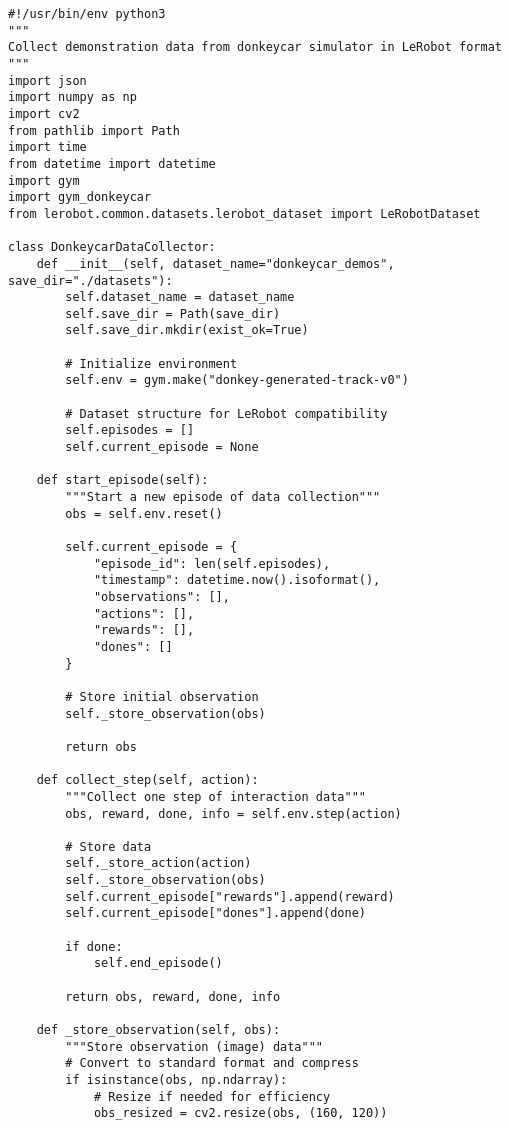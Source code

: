\documentclass[11pt,a4paper]{article}
\begin{document}
\begin{lstlisting}[style=pythonstyle, caption={Data collection for LeRobot (collect\_demonstrations.py)}]
#!/usr/bin/env python3
"""
Collect demonstration data from donkeycar simulator in LeRobot format
"""
import json
import numpy as np
import cv2
from pathlib import Path
import time
from datetime import datetime
import gym
import gym_donkeycar
from lerobot.common.datasets.lerobot_dataset import LeRobotDataset

class DonkeycarDataCollector:
    def __init__(self, dataset_name="donkeycar_demos", save_dir="./datasets"):
        self.dataset_name = dataset_name
        self.save_dir = Path(save_dir)
        self.save_dir.mkdir(exist_ok=True)
        
        # Initialize environment
        self.env = gym.make("donkey-generated-track-v0")
        
        # Dataset structure for LeRobot compatibility
        self.episodes = []
        self.current_episode = None
        
    def start_episode(self):
        """Start a new episode of data collection"""
        obs = self.env.reset()
        
        self.current_episode = {
            "episode_id": len(self.episodes),
            "timestamp": datetime.now().isoformat(),
            "observations": [],
            "actions": [],
            "rewards": [],
            "dones": []
        }
        
        # Store initial observation
        self._store_observation(obs)
        
        return obs
    
    def collect_step(self, action):
        """Collect one step of interaction data"""
        obs, reward, done, info = self.env.step(action)
        
        # Store data
        self._store_action(action)
        self._store_observation(obs)
        self.current_episode["rewards"].append(reward)
        self.current_episode["dones"].append(done)
        
        if done:
            self.end_episode()
            
        return obs, reward, done, info
    
    def _store_observation(self, obs):
        """Store observation (image) data"""
        # Convert to standard format and compress
        if isinstance(obs, np.ndarray):
            # Resize if needed for efficiency
            obs_resized = cv2.resize(obs, (160, 120))
            

\end{lstlisting}
\end{document}
